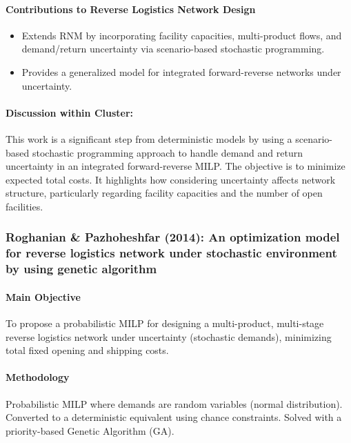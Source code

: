 \paragraph{Contributions to Reverse Logistics Network Design}
\begin{itemize}
    \item Extends RNM by incorporating facility capacities, multi-product flows, and demand/return uncertainty via scenario-based stochastic programming.
    \item Provides a generalized model for integrated forward-reverse networks under uncertainty.
\end{itemize}
\paragraph{Discussion within Cluster:} This work is a significant step from deterministic models by using a scenario-based stochastic programming approach to handle demand and return uncertainty in an integrated forward-reverse MILP. The objective is to minimize expected total costs. It highlights how considering uncertainty affects network structure, particularly regarding facility capacities and the number of open facilities.

\subsubsection{Roghanian \& Pazhoheshfar (2014): An optimization model for reverse logistics network under stochastic environment by using genetic algorithm}
\paragraph{Main Objective} To propose a probabilistic MILP for designing a multi-product, multi-stage reverse logistics network under uncertainty (stochastic demands), minimizing total fixed opening and shipping costs.
\paragraph{Methodology} Probabilistic MILP where demands are random variables (normal distribution). Converted to a deterministic equivalent using chance constraints. Solved with a priority-based Genetic Algorithm (GA).
